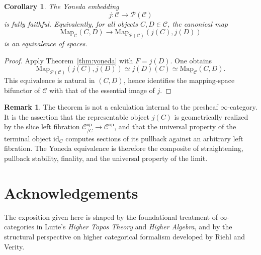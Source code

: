 \documentclass[11pt]{article}
\newtheorem{corollary}[theorem]{Corollary}
\theoremstyle{definition}
\newtheorem{remark}[theorem]{Remark}
\newcommand{\C}{\mathcal{C}}
\newcommand{\PSh}{\mathcal{P}(\mathcal{C})}
\newcommand{\Map}{\mathrm{Map}}
\newcommand{\id}{\mathrm{id}}
\newcommand{\op}{\mathrm{op}}
\begin{document}
\begin{corollary}\label{cor:fully-faithful}
The Yoneda embedding
\[
  j \colon \C \to \PSh
\]
is fully faithful. Equivalently, for all objects $C,D \in \C$, the canonical map
\[
  \Map_{\C}(C,D) \to \Map_{\PSh}(j(C),j(D))
\]
is an equivalence of spaces.
\end{corollary}

\begin{proof}
Apply Theorem~\ref{thm:yoneda} with $F=j(D)$. One obtains
\[
  \Map_{\PSh}(j(C),j(D)) \simeq j(D)(C) \simeq \Map_{\C}(C,D).
\]
This equivalence is natural in $(C,D)$, hence identifies the mapping-space
bifunctor of $\C$ with that of the essential image of $j$.
\end{proof}

\begin{remark}
The theorem is not a calculation internal to the presheaf $\infty$-category. It
is the assertion that the representable object $j(C)$ is geometrically realized by
the slice left fibration $\C^{\op}_{/C} \to \C^{\op}$, and that the universal
property of the terminal object $\id_C$ computes sections of its pullback against
an arbitrary left fibration. The Yoneda equivalence is therefore the composite of
straightening, pullback stability, finality, and the universal property of the
limit.
\end{remark}

\section*{Acknowledgements}

The exposition given here is shaped by the foundational treatment of
$\infty$-categories in Lurie's \emph{Higher Topos Theory} and \emph{Higher
Algebra}, and by the structural perspective on higher categorical formalism
developed by Riehl and Verity.
\end{document}
